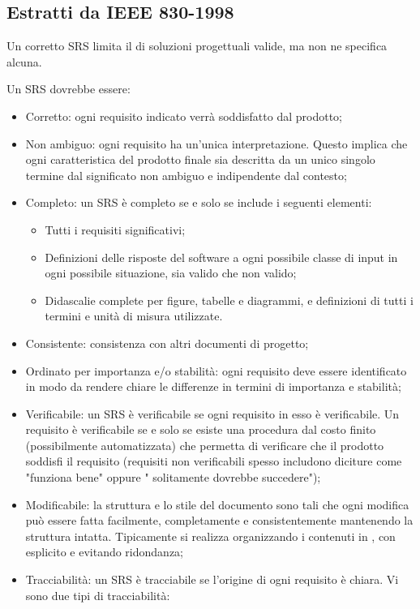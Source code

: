 \subsection{Estratti da IEEE 830-1998}

Un corretto SRS limita il  di soluzioni progettuali valide,
ma non ne specifica alcuna.

Un SRS dovrebbe essere:

\begin{itemize}
  \item Corretto: ogni requisito indicato verrà soddisfatto dal prodotto;
  \item Non ambiguo: ogni requisito ha un'unica interpretazione. Questo implica
        che ogni caratteristica del prodotto finale sia descritta da un unico
        singolo termine dal significato non ambiguo e indipendente dal contesto;
  \item Completo: un SRS è completo se e solo se include i seguenti elementi:

    \begin{itemize}
      \item Tutti i requisiti significativi;
      \item Definizioni delle risposte del software a ogni possibile classe di
            input in ogni possibile situazione, sia valido che non valido;
      \item Didascalie complete per figure, tabelle e diagrammi, e definizioni
      di tutti i termini e unità di misura utilizzate.
    \end{itemize}

  \item Consistente: consistenza con altri documenti di progetto;
  \item Ordinato per importanza e/o stabilità: ogni requisito deve essere
        identificato in modo da rendere chiare le differenze in termini di
        importanza e stabilità;
  \item Verificabile: un SRS è verificabile se ogni requisito in esso è
        verificabile. Un requisito è verificabile se e solo se esiste una
        procedura dal costo finito (possibilmente automatizzata) che permetta di
        verificare che il prodotto soddisfi il requisito (requisiti non
        verificabili spesso includono diciture come "funziona bene" oppure "
        solitamente dovrebbe succedere");
  \item Modificabile: la struttura e lo stile del documento sono tali che ogni
        modifica può essere fatta facilmente, completamente e consistentemente
        mantenendo la struttura intatta. Tipicamente si realizza organizzando i
        contenuti in , con  esplicito e evitando ridondanza;
  \item Tracciabilità: un SRS è tracciabile se l'origine di ogni requisito è
        chiara. Vi sono due tipi di tracciabilità:


\end{itemize}
